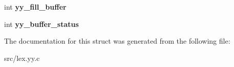 \begin{DoxyCompactItemize}
\item 
\hypertarget{structyy__buffer__state_a63d2afbb1d79a3fc63df9e12626f827d}{int {\bfseries yy\-\_\-fill\-\_\-buffer}}\label{structyy__buffer__state_a63d2afbb1d79a3fc63df9e12626f827d}

\item 
\hypertarget{structyy__buffer__state_a70fd925d37a2f0454fbd0def675d106c}{int {\bfseries yy\-\_\-buffer\-\_\-status}}\label{structyy__buffer__state_a70fd925d37a2f0454fbd0def675d106c}

\end{DoxyCompactItemize}


The documentation for this struct was generated from the following file\-:\begin{DoxyCompactItemize}
\item 
src/lex.\-yy.\-c\end{DoxyCompactItemize}
